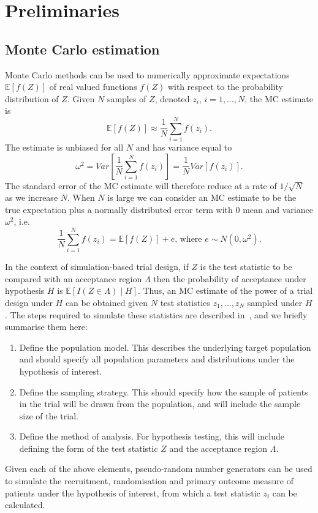 \documentclass{article} %
\begin{document}
\section{Preliminaries}\label{sec:prelim}

\subsection{Monte Carlo estimation}\label{sec:MC}

Monte Carlo methods can be used to numerically approximate expectations $\mathbb{E}[f(Z)]$ of real valued functions $f(Z)$ with respect to the probability distribution of $Z$. Given $N$ samples of $Z$, denoted $z_{i}$, $i=1,\ldots,N$, the MC estimate is
\begin{equation}
\mathbb{E}[f(Z)] \approx \frac{1}{N} \sum_{i=1}^{N} f(z_{i}).
\end{equation}
The estimate is unbiased for all $N$ and has variance equal to
\begin{equation}
\omega^{2} = Var[\frac{1}{N} \sum_{i=1}^{N} f(z_{i})] = \frac{1}{N} Var[f(z_{i})].
\end{equation}
The standard error of the MC estimate will therefore reduce at a rate of $1/\sqrt{N}$ as we increase $N$. When $N$ is large we can consider an MC estimate to be the true expectation plus a normally distributed error term with 0 mean and variance $\omega^{2}$, i.e.
\begin{equation}\label{eqn:MC_error}
\frac{1}{N} \sum_{i=1}^{N} f(z_{i}) = \mathbb{E}[f(Z)] + e \text{, where } e \sim N(0, \omega^{2}).
\end{equation}

In the context of simulation-based trial design, if $Z$ is the test statistic to be compared with an acceptance region $\Lambda$ then the probability of acceptance under hypothesis $H$ is $\mathbb{E}[I(Z \in \Lambda) \mid H]$. Thus, an MC estimate of the power of a trial design under $H$ can be obtained given $N$ test statistics $z_{1}, \ldots , z_{N}$ sampled under $H$. The steps required to simulate these statistics are described in~\cite{Landau2013}, and we briefly summarise them here:
\begin{enumerate}
\item Define the population model. This describes the underlying target population and should specify all population parameters and distributions under the hypothesis of interest.
\item Define the sampling strategy. This should specify how the sample of patients in the trial will be drawn from the population, and will include the sample size of the trial.
\item Define the method of analysis. For hypothesis testing, this will include defining the form of the test statistic $Z$ and the acceptance region $\Lambda$.
\end{enumerate}
Given each of the above elements, pseudo-random number generators can be used to simulate the recruitment, randomisation and primary outcome measure of patients under the hypothesis of interest, from which a test statistic $z_{i}$ can be calculated. 
\end{document}
